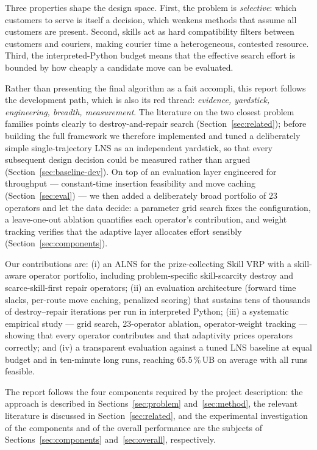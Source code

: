 \documentclass[10pt, a4paper]{article}
\newcommand{\ub}{\%\,UB}
\begin{document}
Three properties shape the design space. First, the problem is
\emph{selective}: which customers to serve is itself a decision, which
weakens methods that assume all customers are present. Second, skills act as
hard compatibility filters between customers and couriers, making courier
time a heterogeneous, contested resource. Third, the interpreted-Python
budget means that the effective search effort is bounded by how cheaply a
candidate move can be evaluated.

Rather than presenting the final algorithm as a fait accompli, this report
follows the development path, which is also its red thread:
\emph{evidence, yardstick, engineering, breadth, measurement}. The
literature on the two closest problem families points clearly to
destroy-and-repair search (Section~\ref{sec:related}); before building the
full framework we therefore implemented and tuned a deliberately simple
single-trajectory LNS as an independent yardstick, so that every subsequent
design decision could be measured rather than argued
(Section~\ref{sec:baseline-dev}). On top of an evaluation layer engineered
for throughput --- constant-time insertion feasibility and move caching
(Section~\ref{sec:eval}) --- we then added a deliberately broad portfolio of
23 operators and let the data decide: a parameter grid search fixes the
configuration, a leave-one-out ablation quantifies each operator's
contribution, and weight tracking verifies that the adaptive layer allocates
effort sensibly (Section~\ref{sec:components}).

Our contributions are: (i) an ALNS for the prize-collecting Skill VRP with a
skill-aware operator portfolio, including problem-specific skill-scarcity
destroy and scarce-skill-first repair operators; (ii) an evaluation
architecture (forward time slacks, per-route move caching, penalized
scoring) that sustains tens of thousands of destroy--repair iterations per
run in interpreted Python; (iii) a systematic empirical study --- grid
search, 23-operator ablation, operator-weight tracking --- showing that
every operator contributes and that adaptivity prices operators correctly;
and (iv) a transparent evaluation against a tuned LNS baseline at equal
budget and in ten-minute long runs, reaching 65.5\,\ub{} on average with all
runs feasible.

The report follows the four components required by the project description:
the approach is described in Sections~\ref{sec:problem}
and~\ref{sec:method}, the relevant literature is discussed in
Section~\ref{sec:related}, and the experimental investigation of the
components and of the overall performance are the subjects of
Sections~\ref{sec:components} and~\ref{sec:overall}, respectively.
\end{document}
